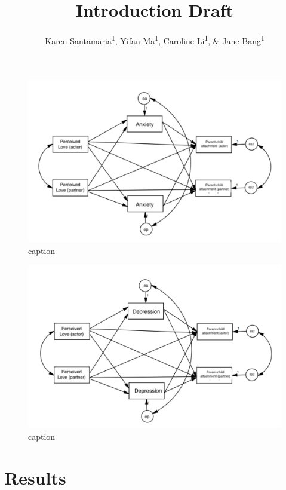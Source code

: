 \documentclass[man]{apa6}
\title{Introduction Draft}
\author{Karen Santamaria\textsuperscript{1}, Yifan Ma\textsuperscript{1}, Caroline Li\textsuperscript{1}, \& Jane Bang\textsuperscript{1}}
\date{}
\affiliation{
\vspace{0.5cm}
\textsuperscript{1} Smith College}
\begin{document}
\maketitle

\begin{figure}

{\centering \includegraphics[width=500px]{figure1} 

}

\caption{caption}\label{fig:unnamed-chunk-1}
\end{figure}

\begin{figure}

{\centering \includegraphics[width=500px]{figure2} 

}

\caption{caption}\label{fig:unnamed-chunk-2}
\end{figure}

\hypertarget{results}{%
\section{Results}\label{results}}
\end{document}
